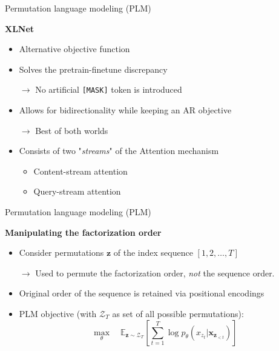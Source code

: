 
\begin{frame}{Permutation language modeling (PLM)}

\vfill

	\textbf{XLNet} 
	
	\begin{itemize}
		\item Alternative objective function
		\item Solves the pretrain-finetune discrepancy
		\item[$\to$] No artificial \texttt{[MASK]} token is introduced
		\item Allows for bidirectionality while keeping an AR objective
		\item[$\to$] Best of both worlds
		\item Consists of two "\textit{streams}" of the Attention mechanism
				\begin{itemize}
					\item Content-stream attention
					\item Query-stream attention
				\end{itemize}
	\end{itemize}
	
\vfill

\end{frame}


\begin{frame}{Permutation language modeling (PLM)}

\vfill
	
	\textbf{Manipulating the factorization order}
	
	\begin{itemize}
		\item Consider permutations $\mathbf{z}$ of the index sequence $[1,2, \hdots, T]$
		\item[$\to$] Used to permute the factorization order, \textit{not} the sequence order.
		\item Original order of the sequence is retained via positional encodings
		\item PLM objective (with $\mathcal{Z}_T$ as set of all possible permutations):
					$$\max_{\theta} \quad \mathds{E}_{\mathbf{z}\sim\mathcal{Z}_T} \left[ \sum_{t=1}^{T} \log p_\theta (x_{z_t} | \mathbf{x}_{\mathbf{z}_{< t}}) \right]$$
	\end{itemize}
	
\vfill

\end{frame}

